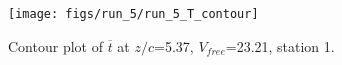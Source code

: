 \begin{figure}[H]
\centering
\texttt{[image: figs/run\_5/run\_5\_T\_contour]}
\caption{Contour plot of $\overline{t}$ at $z/c$=5.37, $V_{free}$=23.21, station 1.}
\label{fig:run_5_T_contour}
\end{figure}


